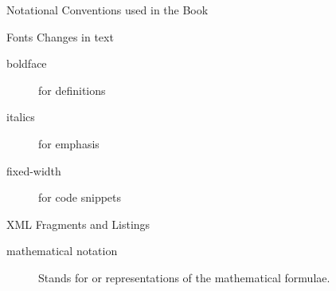 
\begin{omgroup}[id=notation]{Notational Conventions used in the Book}

\begin{omgroup}[id=notation.fonts]{Fonts Changes in text}

  \begin{description}
  \item[boldface] for definitions
  \item[italics] for emphasis
  \item[fixed-width] for code snippets
  \end{description}
\end{omgroup}

\begin{omgroup}[id=notation.xml]{XML Fragments and Listings}

  \begin{description}
  \item[mathematical notation] Stands for {\openmath} or {\cmathml} representations of the
    mathematical formulae.
  \end{description}
\end{omgroup}
\end{omgroup}
